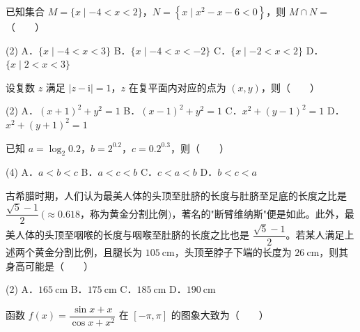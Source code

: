 \begin{question}
已知集合 $M=\{x\mid-4<x<2\}$，$N=\left\{x\mid x^{2}-x-6<0\right\}$，则 $M\cap N=$\mbox{（　　）}

\begin{gkopts}(2)
\task A．$\{x\mid-4<x<3\}$
\task B．$\{x\mid-4<x<-2\}$
\task C．$\{x\mid-2<x<2\}$
\task D．$\{x\mid2<x<3\}$
\end{gkopts}

\end{question}
\begin{question}
设复数 $z$ 满足 $|z-\mathrm i|=1$，$z$ 在复平面内对应的点为 $(x,y)$，则\mbox{（　　）}

\begin{gkopts}(2)
\task A．$(x+1)^{2}+y^{2}=1$
\task B．$(x-1)^{2}+y^{2}=1$
\task C．$x^{2}+(y-1)^{2}=1$
\task D．$x^{2}+(y+1)^{2}=1$
\end{gkopts}

\end{question}
\begin{question}
已知 $a=\log_2 0.2$，$b=2^{0.2}$，$c=0.2^{0.3}$，则\mbox{（　　）}

\begin{gkopts}(4)
\task A．$a<b<c$
\task B．$a<c<b$
\task C．$c<a<b$
\task D．$b<c<a$
\end{gkopts}

\end{question}
\begin{question}
古希腊时期，人们认为最美人体的头顶至肚脐的长度与肚脐至足底的长度之比是 $\dfrac{\sqrt5-1}2\ (\approx0.618$，称为黄金分割比例$)$，著名的"断臂维纳斯"便是如此。此外，最美人体的头顶至咽喉的长度与咽喉至肚脐的长度之比也是 $\dfrac{\sqrt5-1}2$。若某人满足上述两个黄金分割比例，且腿长为 $105\ \mathrm{cm}$，头顶至脖子下端的长度为 $26\ \mathrm{cm}$，则其身高可能是\mbox{（　　）}

\begin{gkopts}(2)
\task A．$165\ \mathrm{cm}$
\task B．$175\ \mathrm{cm}$
\task C．$185\ \mathrm{cm}$
\task D．$190\ \mathrm{cm}$
\end{gkopts}

\Needspace{0.4\textheight}
\end{question}
\begin{question}
函数 $f(x)=\dfrac{\sin x+x}{\cos x+x^{2}}$ 在 $[-\pi,\pi]$ 的图象大致为\mbox{（　　）}
\nopagebreak[4]
\begin{center}\end{center}
\nopagebreak[4]
\end{question}
